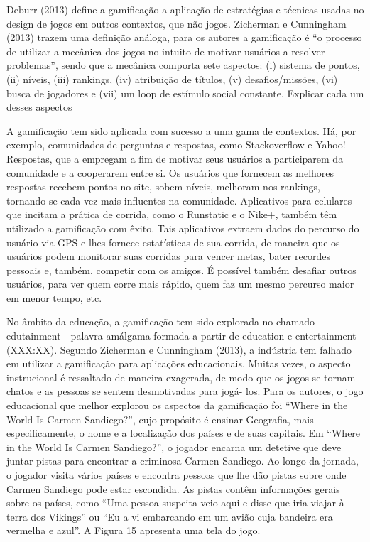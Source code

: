 Deburr (2013) define a gamifica\c{c}\~ao a aplica\c{c}\~ao de estrat\'egias e t\'ecnicas
usadas no design de jogos em outros contextos, que n\~ao jogos. Zicherman
e Cunningham (2013) trazem uma defini\c{c}\~ao an\'aloga, para os autores a
gamifica\c{c}\~ao \'e ``o processo de utilizar a mec\^anica dos jogos no intuito
de motivar usu\'arios a resolver problemas'', sendo que a mec\^anica
comporta sete aspectos: (i) sistema de pontos, (ii) n\'iveis, (iii)
rankings, (iv) atribui\c{c}\~ao de t\'itulos, (v) desafios/miss\~oes, (vi) busca
de jogadores e (vii) um loop de est\'imulo social constante. Explicar cada
um desses aspectos

A gamifica\c{c}\~ao tem sido aplicada com sucesso a uma gama de contextos. H\'a,
por exemplo, comunidades de perguntas e respostas, como Stackoverflow e
Yahoo! Respostas, que a empregam a fim de motivar seus usu\'arios a
participarem da comunidade e a cooperarem entre si. Os usu\'arios que
fornecem as melhores respostas recebem pontos no site, sobem n\'iveis,
melhoram nos rankings, tornando-se cada vez mais influentes na
comunidade. Aplicativos para celulares que incitam a pr\'atica de corrida,
como o Runstatic e o Nike+, tamb\'em t\^em utilizado a gamifica\c{c}\~ao com
\^exito. Tais aplicativos extraem dados do percurso do usu\'ario via GPS e
lhes fornece estat\'isticas de sua corrida, de maneira que os usu\'arios
podem monitorar suas corridas para vencer metas, bater recordes pessoais
e, tamb\'em, competir com os amigos. \'E poss\'ivel tamb\'em desafiar outros
usu\'arios, para ver quem corre mais r\'apido, quem faz um mesmo percurso
maior em menor tempo, etc.

No \^ambito da educa\c{c}\~ao, a gamifica\c{c}\~ao tem sido explorada no chamado
edutainment - palavra am\'algama formada a partir de education e
entertainment (XXX:XX). Segundo Zicherman e Cunningham (2013), a
ind\'ustria tem falhado em utilizar a gamifica\c{c}\~ao para aplica\c{c}\~oes
educacionais. Muitas vezes, o aspecto instrucional \'e ressaltado de
maneira exagerada, de modo que os jogos se tornam chatos e as pessoas se
sentem desmotivadas para jog\'a- los. Para os autores, o jogo educacional
que melhor explorou os aspectos da gamifica\c{c}\~ao foi ``Where in the World
Is Carmen Sandiego?'', cujo prop\'osito \'e ensinar Geografia, mais
especificamente, o nome e a localiza\c{c}\~ao dos pa\'ises e de suas capitais.
Em ``Where in the World Is Carmen Sandiego?'', o jogador encarna um
detetive que deve juntar pistas para encontrar a criminosa Carmen
Sandiego. Ao longo da jornada, o jogador visita v\'arios pa\'ises e encontra
pessoas que lhe d\~ao pistas sobre onde Carmen Sandiego pode estar
escondida. As pistas cont\^em informa\c{c}\~oes gerais sobre os pa\'ises, como
``Uma pessoa suspeita veio aqui e disse que iria viajar à terra dos
Vikings'' ou ``Eu a vi embarcando em um avi\~ao cuja bandeira era vermelha
e azul''. A Figura 15 apresenta uma tela do jogo.

